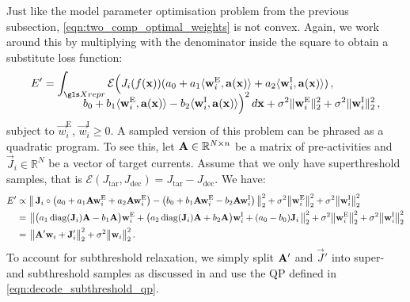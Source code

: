 Just like the model parameter optimisation problem from the previous subsection, \cref{eqn:two_comp_optimal_weights} is not convex.
Again, we work around this by multiplying with the denominator inside the square to obtain a substitute loss function:
\begin{align}
	\begin{aligned}
	E' &=
		\int_{\Xrepr} \mathcal{E}
		\Bigl(
			J_i(f(\vec x)) (a_0 + a_1 \langle \vec w^\mathrm{E}_i, \vec a(\vec x) \rangle + a_2 \langle \vec w^\mathrm{I}_i, \vec a(\vec x) \rangle )\,, \\[-1em]
		&\hspace{3.66em}		
		b_0 + b_1 \langle \vec w^\mathrm{E}_i, \vec a(\vec x) \rangle - b_2 \langle \vec w^\mathrm{I}_i, \vec a(\vec x) \rangle
		\Bigr)^2 \, d\vec x
		 + \sigma^2 \| \vec w^\mathrm{E}_i \|^2_2 + \sigma^2 \| \vec w^\mathrm{I}_i \|^2_2 \,,
	\end{aligned}
	\label{eqn:two_comp_optimal_weights_prime}
\end{align}
subject to $\vec w^\mathrm{E}_i$, $\vec w^\mathrm{I}_i \geq 0$.
A sampled version of this problem can be phrased as a quadratic program.
To see this, let $\mathbf{A} \in \mathbb{R}^{N \times n}$ be a matrix of pre-activities and $\vec J_i \in \mathbb{R}^{N}$ be a vector of target currents.
Assume that we only have superthreshold samples, that is $\mathcal{E}(J_\mathrm{tar}, J_\mathrm{dec}) = J_\mathrm{tar} - J_\mathrm{dec}$. We have:
\begin{align}
	E' &\propto \bigl\|	\,
		  \mathbf{J}_i \circ
		  	\bigl(
		  		a_0 +
		  		a_1 \mathbf{A} \mathbf{w}_i^\mathrm{E} +
		  		a_2 \mathbf{A} \mathbf{w}_i^\mathrm{E} \bigr)
	      - \bigl(
	      		b_0 +
	      		b_1 \mathbf{A} \mathbf{w}_i^\mathrm{E} -
	      		b_2 \mathbf{A} \mathbf{w}_i^\mathrm{I} \bigr)
	\, \bigr\|_2^2
	+ \sigma^2 \bigl\| \mathbf{w}^\mathrm{E}_i \bigr\|^2_2 + \sigma^2 \bigl\| \mathbf{w}^\mathrm{I}_i \bigr\|^2_2 \notag \\
		&= \hspace{0.125em} \bigl\|
			\bigl(a_1 \operatorname{\mathrm{diag}}(\mathbf{J}_i) \mathbf{A} - b_1 \mathbf{A} \bigr) \mathbf{w}_i^\mathrm{E}
			+ \bigl(a_2 \operatorname{\mathrm{diag}}(\mathbf{J}_i) \mathbf{A} + b_2 \mathbf{A} \bigr) \mathbf{w}_i^\mathrm{I}
			+ (a_0 - b_0) \mathbf{J}_i
	\, \bigr\|_2^2
	+ \sigma^2 \bigl\| \mathbf{w}^\mathrm{E}_i \bigr\|^2_2 
	+ \sigma^2 \bigl\| \mathbf{w}^\mathrm{I}_i \bigr\|^2_2  \notag \\
	&= \hspace{0.125em} \bigl\|
		\mathbf{A}' \mathbf{w}_i + \mathbf{J}_i'
	\bigr\|_2^2
	+ \sigma^2 \bigl\| \mathbf{w}_i \bigr\|^2_2  \,.
	\label{eqn:two_comp_optimal_weights_prime_matrix}
\end{align}
To account for subthreshold relaxation, we simply split $\mathbf{A}'$ and $\vec J'$ into super- and subthreshold samples as discussed in  and use the QP defined in \cref{eqn:decode_subthreshold_qp}.

